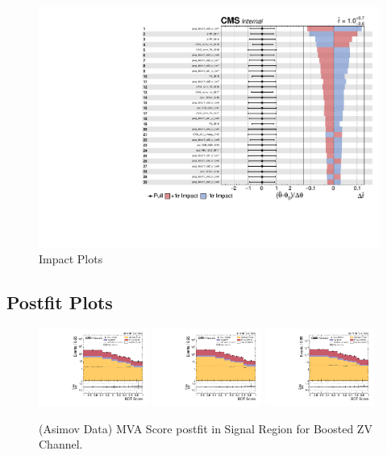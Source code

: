\begin{figure}[!ht]
  \centering
  \includegraphics[width=\textwidth,page=3]{analysis_plots/impact_plots/impacts_datacard_run2_z.pdf}
  \caption[Impact Plots]%
  {Impact Plots}%
  \label{fig:vbs-impact-plots-page3}
\end{figure}

\clearpage
\subsection{
  Postfit Plots
}

\begin{figure}[!ht]
  \centering
  \includegraphics[width=0.32\textwidth]{analysis_plots/2016_zv.sr_l_postfit/sr_l_postfit/mva_score_zv_var2_log.pdf}
  \includegraphics[width=0.32\textwidth]{analysis_plots/2017_zv.sr_l_postfit/sr_l_postfit/mva_score_zv_var2_log.pdf}
  \includegraphics[width=0.32\textwidth]{analysis_plots/2018_zv.sr_l_postfit/sr_l_postfit/mva_score_zv_var2_log.pdf} \\
  \caption[MVA Score postfit in Signal Region for Boosted ZV Channel]%
  {(Asimov Data) MVA Score postfit in Signal Region for Boosted ZV Channel.}%
  \label{fig:zv-sr-l-mva-score-postfit}
\end{figure}

